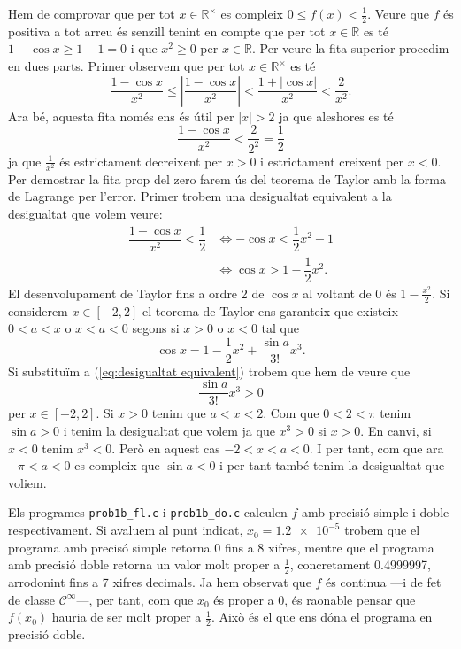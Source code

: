 \documentclass[12pt]{article}
\newcommand{\abs}[1]{\left\lvert#1\right\rvert}
\newcommand{\R}{\mathbb{R}}
\begin{document}
Hem de comprovar que per tot \( x \in \R^{\times} \) es compleix \( 0 \leq f(x) < \frac{1}{2} \).
Veure que \( f \) és positiva a tot arreu és senzill tenint en compte que per tot \( x \in \R \) es té \( 1 - \cos{x} \geq 1 - 1 = 0 \) i que \( x^2 \geq 0 \) per \( x \in \R \). Per veure la fita superior procedim en dues parts.	Primer observem que per tot \( x \in \R^{\times} \) es té
\begin{equation*}
	\dfrac{1 - \cos{x}}{x^2} \leq \abs{\dfrac{1 - \cos{x}}{x^2}} < \dfrac{1 + \abs{\cos{x}}}{x^2} < \dfrac{2}{x^2}.
\end{equation*}
Ara bé, aquesta fita només ens és útil per \( \abs{x} > 2 \) ja que aleshores es té
\begin{equation*}
	\dfrac{1 - \cos{x}}{x^2} < \dfrac{2}{2^2} = \dfrac{1}{2}
\end{equation*}
ja que \( \frac{1}{x^2} \) és estrictament decreixent per \( x > 0 \) i estrictament creixent per \( x < 0 \). Per demostrar la fita prop del zero farem ús del teorema de Taylor amb la forma de Lagrange per l'error. Primer trobem una desigualtat equivalent a la desigualtat que volem veure:
\begin{align*}
	\dfrac{1 - \cos{x}}{x^2} < \dfrac{1}{2} & \iff -\cos{x} < \dfrac{1}{2}x^2 - 1 \\
																					& \iff \cos{x} > 1 - \dfrac{1}{2}x^2. \label{eq:desigualtat equivalent} \tag{$\ast$}
\end{align*}
El desenvolupament de Taylor fins a ordre 2 de \( \cos{x} \) al voltant de 0 és \( 1 - \frac{x^2}{2} \). Si considerem \( x \in [-2,2] \) el teorema de Taylor ens garanteix que existeix \( 0 < a < x \) o \( x < a < 0 \) segons si \( x > 0 \) o \( x < 0 \) tal que
\begin{equation*}
	\cos{x} = 1 - \dfrac{1}{2}x^2 + \dfrac{\sin{a}}{3!} x^3.
\end{equation*}
Si substituïm a (\ref{eq:desigualtat equivalent}) trobem que hem de veure que
\begin{equation*}
	\dfrac{\sin{a}}{3!}x^3 > 0
\end{equation*}
per \( x \in [-2,2] \). Si \( x >0 \) tenim que \( a < x < 2 \). Com que \( 0 < 2 < \pi \) tenim \( \sin{a} > 0 \) i tenim la desigualtat que volem ja que \( x^3 > 0 \) si \( x > 0 \). En canvi, si \( x < 0 \) tenim \( x^3 < 0 \). Però en aquest cas \( -2 < x < a < 0 \). I per tant, com que ara \( -\pi < a < 0 \) es compleix que \( \sin{a} < 0 \) i per tant també tenim la desigualtat que voliem.

Els programes \texttt{prob1b\_fl.c} i \texttt{prob1b\_do.c} calculen \( f \) amb precisió simple i doble respectivament. Si avaluem al punt indicat, \( x_0 = \num{1.2e-5} \) trobem que el programa amb precisó simple retorna 0 fins a 8 xifres, mentre que el programa amb precisió doble retorna un valor molt proper a \( \frac{1}{2} \), concretament \num{0.4999997}, arrodonint fins a 7 xifres decimals. Ja hem observat que \( f \) és continua ---i de fet de classe \( \mathcal{C}^{\infty} \)---, per tant, com que \( x_0 \) és proper a 0, és raonable pensar que \( f(x_0) \) hauria de ser molt proper a \( \frac{1}{2} \). Això és el que ens dóna el programa en precisió doble.
\end{document}
